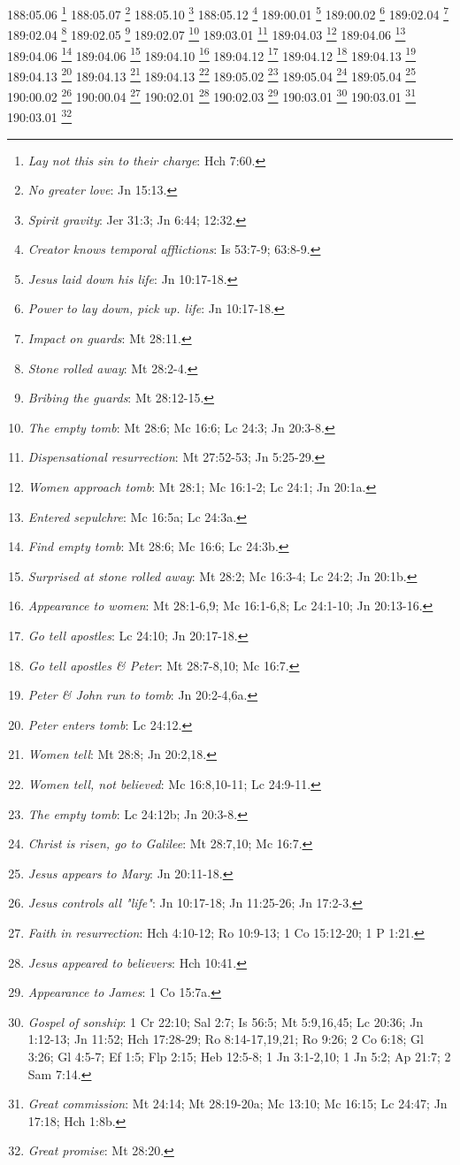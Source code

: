 188:05.06 \footnote{\textit{Lay not this sin to their charge}: Hch 7:60.}
188:05.07 \footnote{\textit{No greater love}: Jn 15:13.}
188:05.10 \footnote{\textit{Spirit gravity}: Jer 31:3; Jn 6:44; 12:32.}
188:05.12 \footnote{\textit{Creator knows temporal afflictions}: Is 53:7-9; 63:8-9.}
189:00.01 \footnote{\textit{Jesus laid down his life}: Jn 10:17-18.}
189:00.02 \footnote{\textit{Power to lay down, pick up. life}: Jn 10:17-18.}
189:02.04 \footnote{\textit{Impact on guards}: Mt 28:11.}
189:02.04 \footnote{\textit{Stone rolled away}: Mt 28:2-4.}
189:02.05 \footnote{\textit{Bribing the guards}: Mt 28:12-15.}
189:02.07 \footnote{\textit{The empty tomb}: Mt 28:6; Mc 16:6; Lc 24:3; Jn 20:3-8.}
189:03.01 \footnote{\textit{Dispensational resurrection}: Mt 27:52-53; Jn 5:25-29.}
189:04.03 \footnote{\textit{Women approach tomb}: Mt 28:1; Mc 16:1-2; Lc 24:1; Jn 20:1a.}
189:04.06 \footnote{\textit{Entered sepulchre}: Mc 16:5a; Lc 24:3a.}
189:04.06 \footnote{\textit{Find empty tomb}: Mt 28:6; Mc 16:6; Lc 24:3b.}
189:04.06 \footnote{\textit{Surprised at stone rolled away}: Mt 28:2; Mc 16:3-4; Lc 24:2; Jn 20:1b.}
189:04.10 \footnote{\textit{Appearance to women}: Mt 28:1-6,9; Mc 16:1-6,8; Lc 24:1-10; Jn 20:13-16.}
189:04.12 \footnote{\textit{Go tell apostles}: Lc 24:10; Jn 20:17-18.}
189:04.12 \footnote{\textit{Go tell apostles & Peter}: Mt 28:7-8,10; Mc 16:7.}
189:04.13 \footnote{\textit{Peter & John run to tomb}: Jn 20:2-4,6a.}
189:04.13 \footnote{\textit{Peter enters tomb}: Lc 24:12.}
189:04.13 \footnote{\textit{Women tell}: Mt 28:8; Jn 20:2,18.}
189:04.13 \footnote{\textit{Women tell, not believed}: Mc 16:8,10-11; Lc 24:9-11.}
189:05.02 \footnote{\textit{The empty tomb}: Lc 24:12b; Jn 20:3-8.}
189:05.04 \footnote{\textit{Christ is risen, go to Galilee}: Mt 28:7,10; Mc 16:7.}
189:05.04 \footnote{\textit{Jesus appears to Mary}: Jn 20:11-18.}
190:00.02 \footnote{\textit{Jesus controls all "life"}: Jn 10:17-18; Jn 11:25-26; Jn 17:2-3.}
190:00.04 \footnote{\textit{Faith in resurrection}: Hch 4:10-12; Ro 10:9-13; 1 Co 15:12-20; 1 P 1:21.}
190:02.01 \footnote{\textit{Jesus appeared to believers}: Hch 10:41.}
190:02.03 \footnote{\textit{Appearance to James}: 1 Co 15:7a.}
190:03.01 \footnote{\textit{Gospel of sonship}: 1 Cr 22:10; Sal 2:7; Is 56:5; Mt 5:9,16,45; Lc 20:36; Jn 1:12-13; Jn 11:52; Hch 17:28-29; Ro 8:14-17,19,21; Ro 9:26; 2 Co 6:18; Gl 3:26; Gl 4:5-7; Ef 1:5; Flp 2:15; Heb 12:5-8; 1 Jn 3:1-2,10; 1 Jn 5:2; Ap 21:7; 2 Sam 7:14.}
190:03.01 \footnote{\textit{Great commission}: Mt 24:14; Mt 28:19-20a; Mc 13:10; Mc 16:15; Lc 24:47; Jn 17:18; Hch 1:8b.}
190:03.01 \footnote{\textit{Great promise}: Mt 28:20.}
